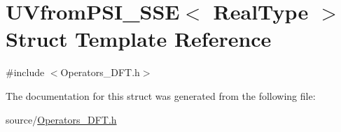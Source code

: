 \hypertarget{struct_u_vfrom_p_s_i___s_s_e}{}\section{U\+Vfrom\+P\+S\+I\+\_\+\+S\+S\+E$<$ Real\+Type $>$ Struct Template Reference}
\label{struct_u_vfrom_p_s_i___s_s_e}


{\ttfamily \#include $<$Operators\+\_\+\+D\+F\+T.\+h$>$}



The documentation for this struct was generated from the following file\+:\begin{DoxyCompactItemize}
\item 
source/\hyperlink{_operators___d_f_t_8h}{Operators\+\_\+\+D\+F\+T.\+h}\end{DoxyCompactItemize}
